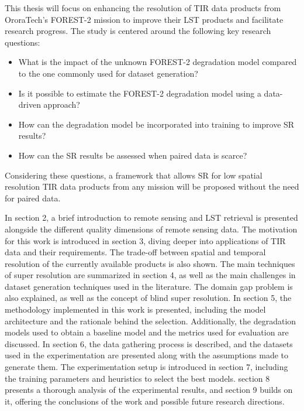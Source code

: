 This thesis will focus on enhancing the resolution of TIR data products from OroraTech's FOREST-2 mission to improve their LST products and facilitate research progress. The study is centered around the following key research questions:

\begin{itemize}
    \item What is the impact of the unknown FOREST-2 degradation model compared to the one commonly used for dataset generation?
    \item Is it possible to estimate the FOREST-2 degradation model using a data-driven approach?
    \item How can the degradation model be incorporated into training to improve SR results?
    \item  How can the SR results be assessed when paired data is scarce?
\end{itemize}

Considering these questions, a framework that allows SR for low spatial resolution TIR data products from any mission will be proposed without the need for paired data.
 
In section 2, a brief introduction to remote sensing and LST retrieval is presented alongside the different quality dimensions of remote sensing data. The motivation for this work is introduced in section 3, diving deeper into applications of TIR data and their requirements. The trade-off between spatial and temporal resolution of the currently available products is also shown. The main techniques of super resolution are summarized in section 4, as well as the main challenges in dataset generation techniques used in the literature.
The domain gap problem is also explained, as well as the concept of blind super resolution. In section 5,  the methodology implemented in this work is presented, including the model architecture and the rationale behind the selection. Additionally, the degradation models used to obtain a baseline model and the metrics used for evaluation are discussed. In section 6, the data gathering process is described, and the datasets used in the experimentation are presented along with the assumptions made to generate them. The experimentation setup is introduced in section 7, including the training parameters and heuristics to select the best models. section 8 presents a thorough analysis of the experimental results, and section 9 builds on it, offering the conclusions of the work and possible future research directions.

\newpage

